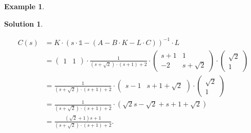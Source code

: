 \documentclass[a4paper,12 pt]{article}
\numberwithin{equation}{section}
\theoremstyle{definition}
\newtheorem{bsp}{Example}
\theoremstyle{remark}
\theoremstyle{definition}
\newtheorem*{lsg}{Solution}
\theoremstyle{definition}
\theoremstyle{definition}
\theoremstyle{remark}
\begin{document}
\begin{bsp}
\begin{lsg}
\begin{enumerate}[(a)]
\begin{equation*}
\begin{split}
C(s)&=K\cdot (s\cdot \mathbb{1}-(A-B\cdot K -L\cdot C))^{-1}\cdot L\\
&=\begin{pmatrix} 1&1 \end{pmatrix}\cdot \frac{1}{(s+\sqrt{2})\cdot (s+1) +2}\cdot \begin{pmatrix}
s+1 & 1\\
-2&s+\sqrt{2}
\end{pmatrix}\cdot \begin{pmatrix} \sqrt{2}\\ 1\end{pmatrix}\\
&=\frac{1}{(s+\sqrt{2})\cdot (s+1) +2}\cdot \begin{pmatrix}
s-1&s+1+\sqrt{2}
 \end{pmatrix}\cdot \begin{pmatrix} \sqrt{2}\\ 1\end{pmatrix}\\
&=\frac{1}{(s+\sqrt{2})\cdot (s+1) +2}\cdot (\sqrt{2}s-\sqrt{2}+s+1+\sqrt{2})\\
&=\frac{(\sqrt{2}+1)s+1}{(s+\sqrt{2})\cdot (s+1) +2}.
\end{split}
\end{equation*}
\end{enumerate}
\end{lsg}
\end{bsp}
\end{document}

